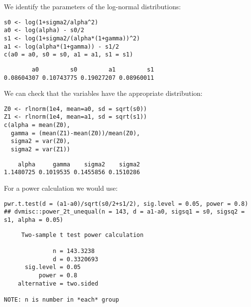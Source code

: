 \documentclass[12pt]{article}
\begin{document}
We identify the parameters of the log-normal distributions:
\lstset{language=r,label= ,caption= ,captionpos=b,numbers=none}
\begin{lstlisting}
s0 <- log(1+sigma2/alpha^2)
a0 <- log(alpha) - s0/2 
s1 <- log(1+sigma2/(alpha*(1+gamma))^2)
a1 <- log(alpha*(1+gamma)) - s1/2 
c(a0 = a0, s0 = s0, a1 = a1, s1 = s1)
\end{lstlisting}

\begin{verbatim}
        a0         s0         a1         s1 
0.08604307 0.10743775 0.19027207 0.08960011
\end{verbatim}

We can check that the variables have the appropriate distribution:
\lstset{language=r,label= ,caption= ,captionpos=b,numbers=none}
\begin{lstlisting}
Z0 <- rlnorm(1e4, mean=a0, sd = sqrt(s0))
Z1 <- rlnorm(1e4, mean=a1, sd = sqrt(s1))
c(alpha = mean(Z0), 
  gamma = (mean(Z1)-mean(Z0))/mean(Z0), 
  sigma2 = var(Z0), 
  sigma2 = var(Z1))
\end{lstlisting}

\begin{verbatim}
    alpha     gamma    sigma2    sigma2 
1.1480725 0.1019535 0.1455856 0.1510286
\end{verbatim}

For a power calculation we would use:
\lstset{language=r,label= ,caption= ,captionpos=b,numbers=none}
\begin{lstlisting}
pwr.t.test(d = (a1-a0)/sqrt(s0/2+s1/2), sig.level = 0.05, power = 0.8)
## dvmisc::power_2t_unequal(n = 143, d = a1-a0, sigsq1 = s0, sigsq2 = s1, alpha = 0.05)
\end{lstlisting}

\begin{verbatim}
     Two-sample t test power calculation 

              n = 143.3238
              d = 0.3320693
      sig.level = 0.05
          power = 0.8
    alternative = two.sided

NOTE: n is number in *each* group
\end{verbatim}
\end{document}
